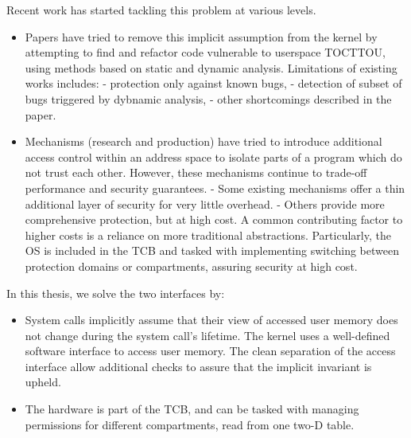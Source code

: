 Recent work has started tackling this problem at various levels. 
\begin{itemize}
  \item Papers have tried to remove this implicit assumption from the kernel by attempting to find and 
        refactor code vulnerable to userspace TOCTTOU, using methods based on static and dynamic analysis.
        Limitations of existing works includes:
        - protection only against known bugs, 
        - detection of subset of bugs triggered by dybnamic analysis,
        - other shortcomings described in the paper.
  \item Mechanisms (research and production) have tried to introduce additional access control within an
        address space to isolate parts of a program which do not trust each other.
        However, these mechanisms continue to trade-off performance and security guarantees. 
        - Some existing mechanisms offer a thin additional layer of security for very little overhead.
        - Others provide more comprehensive protection, but at high cost.
        A common contributing factor to higher costs is a reliance on more traditional abstractions.
        Particularly, the OS is included in the TCB and tasked with implementing switching between
        protection domains or compartments, assuring security at high cost.
\end{itemize}

In this thesis, we solve the two interfaces by:
\begin{itemize}
  \item System calls implicitly assume that their view of accessed user memory does not change
        during the system call's lifetime. 
        The kernel uses a well-defined software interface to access user memory. 
        The clean separation of the access interface allow additional checks to assure that 
        the implicit invariant is upheld.
  \item The hardware is part of the TCB, and can be tasked with managing permissions for different
        compartments, read from one two-D table.
\end{itemize}



